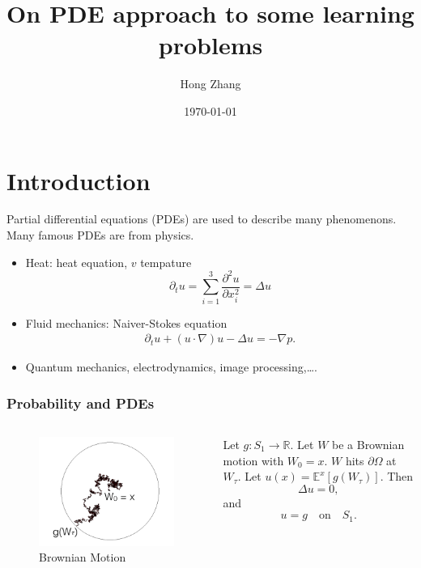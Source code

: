 \documentclass{beamer}
\title[prediction and learning]{On PDE approach to some learning problems} %
\author{Hong Zhang} %
\institute[Brown University] %
{
Applied Math, Brown University \\ %
\medskip
}
\date{\today} %
\begin{document}
\begin{frame}
\titlepage
\end{frame}
\begin{frame}
\tableofcontents
\end{frame}

\section{Introduction}

\begin{frame}
Partial differential equations (PDEs) are used to describe many phenomenons.  Many famous PDEs are from physics.
\begin{itemize}
\item Heat: heat equation, $v$ tempature
\begin{equation*}
\partial_t u = \sum_{i=1}^3\frac{\partial^2 u }{\partial x_i^2} = \Delta u
\end{equation*}
\item Fluid mechanics: Naiver-Stokes equation
\begin{align*}
\partial_t u + (u\cdot\nabla)u - \Delta u = -\nabla p.
\end{align*}
\item Quantum mechanics, electrodynamics, image processing,\ldots.
\end{itemize} 


\end{frame}

\begin{frame}
\frametitle{Probability and PDEs}
\begin{columns}
\begin{figure}
\includegraphics[scale = 0.3]{bmotion.png}
\caption{Brownian Motion}
\end{figure}
Let $g:S_1 \rightarrow \mathbb{R}$. Let $W$ be a Brownian motion with $W_0 = x$. $W$ hits $\partial \Omega$ at $W_{\tau}$. Let $u(x) = \mathbb{E}^x[g(W_\tau)]$.
Then $$\Delta u = 0,$$ 
and $$u = g\quad \text{on}\quad S_1.$$


\end{columns}
\end{frame}
\end{document}

